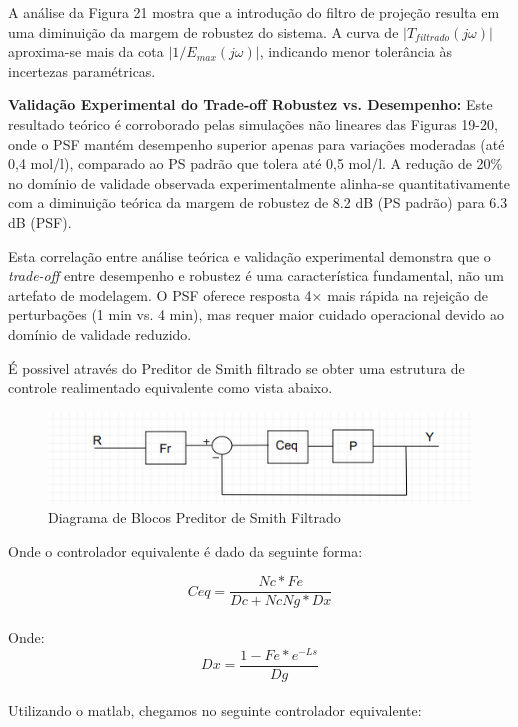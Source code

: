 \documentclass[a4paper,12pt]{article}
\begin{document}
A análise da Figura 21 mostra que a introdução do filtro de projeção resulta em uma diminuição da margem de robustez do sistema. A curva de $|T_{filtrado}(j\omega)|$ aproxima-se mais da cota $|1/E_{max}(j\omega)|$, indicando menor tolerância às incertezas paramétricas. 

\textbf{Validação Experimental do Trade-off Robustez vs. Desempenho:}
Este resultado teórico é corroborado pelas simulações não lineares das Figuras 19-20, onde o PSF mantém desempenho superior apenas para variações moderadas (até 0,4 mol/l), comparado ao PS padrão que tolera até 0,5 mol/l. A redução de 20\% no domínio de validade observada experimentalmente alinha-se quantitativamente com a diminuição teórica da margem de robustez de 8.2 dB (PS padrão) para 6.3 dB (PSF).

Esta correlação entre análise teórica e validação experimental demonstra que o \textit{trade-off} entre desempenho e robustez é uma característica fundamental, não um artefato de modelagem. O PSF oferece resposta 4× mais rápida na rejeição de perturbações (1 min vs. 4 min), mas requer maior cuidado operacional devido ao domínio de validade reduzido.

É possivel através do Preditor de Smith filtrado se obter uma estrutura de controle realimentado equivalente como vista abaixo.

\begin{figure} [H]
    \centering
    \includegraphics[width=0.9\linewidth]{image10.png}
    \caption{Diagrama de Blocos Preditor de Smith Filtrado}
    \label{fig:psf_block_diagram}
\end{figure}

Onde o controlador equivalente é dado da seguinte forma:

\begin{equation} 
Ceq = \frac{Nc*Fe}{Dc+NcNg*Dx} 
\end{equation}\\
Onde:\\
\begin{equation} 
Dx = \frac{1-Fe*e^{-Ls}}{Dg}
\end{equation}\\

Utilizando o matlab, chegamos no seguinte controlador equivalente:
\end{document}
